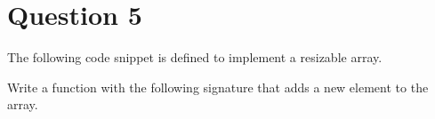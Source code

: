
\section*{Question 5}

The following code snippet is defined to implement a resizable array.

\lstset{language=c,tabsize=4}


Write a function with the following signature that adds a new element to the array.

\lstset{language=c,tabsize=4}

